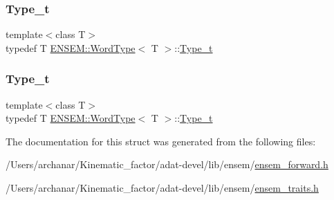 \mbox{\label{structENSEM_1_1WordType_a81392e736486edab6c96af6198ab8337}} 
\subsubsection{\texorpdfstring{Type\_t}{Type\_t}\hspace{0.1cm}{\footnotesize\ttfamily [2/3]}}
{\footnotesize\ttfamily template$<$class T$>$ \\
typedef T \mbox{\hyperlink{structENSEM_1_1WordType}{E\+N\+S\+E\+M\+::\+Word\+Type}}$<$ T $>$\+::\mbox{\hyperlink{structENSEM_1_1WordType_a81392e736486edab6c96af6198ab8337}{Type\+\_\+t}}}

\mbox{\label{structENSEM_1_1WordType_a81392e736486edab6c96af6198ab8337}} 
\subsubsection{\texorpdfstring{Type\_t}{Type\_t}\hspace{0.1cm}{\footnotesize\ttfamily [3/3]}}
{\footnotesize\ttfamily template$<$class T$>$ \\
typedef T \mbox{\hyperlink{structENSEM_1_1WordType}{E\+N\+S\+E\+M\+::\+Word\+Type}}$<$ T $>$\+::\mbox{\hyperlink{structENSEM_1_1WordType_a81392e736486edab6c96af6198ab8337}{Type\+\_\+t}}}



The documentation for this struct was generated from the following files\+:\begin{DoxyCompactItemize}
\item 
/\+Users/archanar/\+Kinematic\+\_\+factor/adat-\/devel/lib/ensem/\mbox{\hyperlink{adat-devel_2lib_2ensem_2ensem__forward_8h}{ensem\+\_\+forward.\+h}}\item 
/\+Users/archanar/\+Kinematic\+\_\+factor/adat-\/devel/lib/ensem/\mbox{\hyperlink{adat-devel_2lib_2ensem_2ensem__traits_8h}{ensem\+\_\+traits.\+h}}\end{DoxyCompactItemize}
